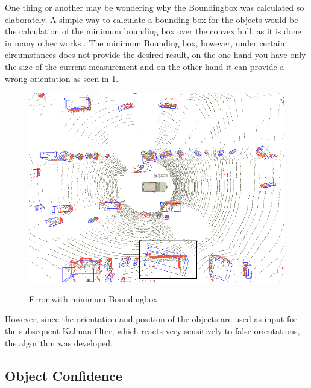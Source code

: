 \documentclass[11pt,oneside,openright]{mpreport}
\begin{document}
One thing or another may be wondering why the Boundingbox was calculated so elaborately. A simple way to calculate a bounding box for the
objects would be the calculation of the minimum bounding box over the convex hull, as it is done in many other works \cite{Zhang, Himmelsbach2009}.
The minimum Bounding box, however, under certain circumstances does not provide the desired result, on the one hand you have only the size of the current measurement and on the 
other hand it can provide a wrong orientation as seen in \cref{min_box}.

\begin{figure}[!ht]
\caption{Error with minimum Boundingbox \cite{Himmelsbach2009}}
\includegraphics[width=\textwidth]{bilder/min_bound.png}
\label{min_box}
\end{figure}


However, since the orientation and position of the objects are used as input for the subsequent Kalman filter, which reacts very sensitively to false orientations, the algorithm was developed.

\subsection{Object Confidence}
\end{document}
